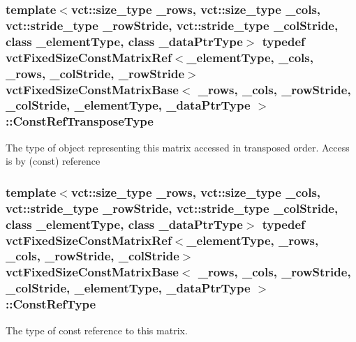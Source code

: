 \subsubsection[{Const\+Ref\+Transpose\+Type}]{\setlength{\rightskip}{0pt plus 5cm}template$<$vct\+::size\+\_\+type \+\_\+rows, vct\+::size\+\_\+type \+\_\+cols, vct\+::stride\+\_\+type \+\_\+row\+Stride, vct\+::stride\+\_\+type \+\_\+col\+Stride, class \+\_\+element\+Type, class \+\_\+data\+Ptr\+Type$>$ typedef {\bf vct\+Fixed\+Size\+Const\+Matrix\+Ref}$<$\+\_\+element\+Type, \+\_\+cols, \+\_\+rows, \+\_\+col\+Stride, \+\_\+row\+Stride$>$ {\bf vct\+Fixed\+Size\+Const\+Matrix\+Base}$<$ \+\_\+rows, \+\_\+cols, \+\_\+row\+Stride, \+\_\+col\+Stride, \+\_\+element\+Type, \+\_\+data\+Ptr\+Type $>$\+::{\bf Const\+Ref\+Transpose\+Type}}\label{classvct_fixed_size_const_matrix_base_a41d41a9a3dc6d0c8e36348a8c2fc83db}
The type of object representing this matrix accessed in transposed order. Access is by (const) reference \hypertarget{classvct_fixed_size_const_matrix_base_a457385fe6e0a82182be90728b60cca79}{}
\subsubsection[{Const\+Ref\+Type}]{\setlength{\rightskip}{0pt plus 5cm}template$<$vct\+::size\+\_\+type \+\_\+rows, vct\+::size\+\_\+type \+\_\+cols, vct\+::stride\+\_\+type \+\_\+row\+Stride, vct\+::stride\+\_\+type \+\_\+col\+Stride, class \+\_\+element\+Type, class \+\_\+data\+Ptr\+Type$>$ typedef {\bf vct\+Fixed\+Size\+Const\+Matrix\+Ref}$<$\+\_\+element\+Type, \+\_\+rows, \+\_\+cols, \+\_\+row\+Stride, \+\_\+col\+Stride$>$ {\bf vct\+Fixed\+Size\+Const\+Matrix\+Base}$<$ \+\_\+rows, \+\_\+cols, \+\_\+row\+Stride, \+\_\+col\+Stride, \+\_\+element\+Type, \+\_\+data\+Ptr\+Type $>$\+::{\bf Const\+Ref\+Type}}\label{classvct_fixed_size_const_matrix_base_a457385fe6e0a82182be90728b60cca79}
The type of const reference to this matrix. \hypertarget{classvct_fixed_size_const_matrix_base_a74355396eec7437755398c2810e0df41}{}
